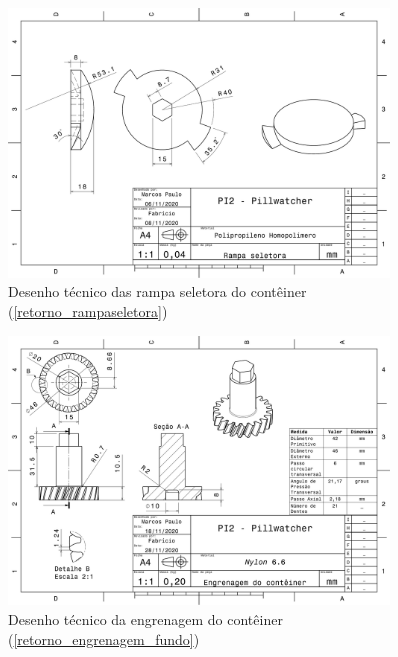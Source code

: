 \begin{apendicesenv}
\begin{figure}[H]
    \centering
    \includegraphics[width=0.9\textwidth]{figuras/estrutura/Desenhos/Rampa_Seletora.pdf}
    \caption{Desenho técnico das rampa seletora do contêiner (\ref{retorno_rampaseletora})}
    \label{fig:rampaseletora}
\end{figure}

\begin{figure}[H]
    \centering
    \includegraphics[width=0.9\textwidth]{figuras/estrutura/Desenhos/Engrenagem_Container_V2.1.pdf}
    \caption{Desenho técnico da engrenagem do contêiner (\ref{retorno_engrenagem_fundo})}
    \label{fig:engrenagem_fundo}
\end{figure}



\end{apendicesenv}

